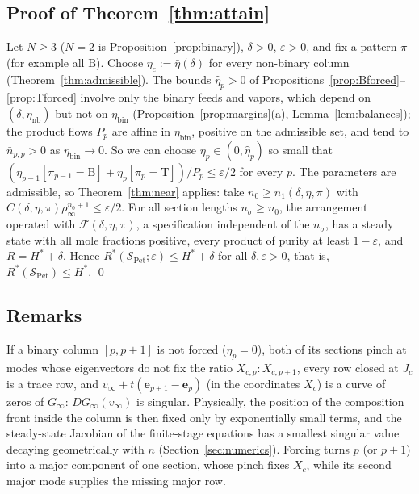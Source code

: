 \documentclass[11pt,a4paper]{report}
\newcommand{\cS}{\mathcal S}
\newcommand{\cF}{\mathcal F}
\newcommand{\bfe}{\mathbf e}
\newcommand{\Hs}{H^{*}}
\newcommand{\Spet}{\cS_{\mathrm{Pet}}}
\newcommand{\Ts}{\mathrm T}
\newcommand{\Bs}{\mathrm B}
\begin{document}
\subsection{Proof of Theorem~\ref{thm:attain}}\label{sec:proofmain}

Let \(N\ge3\) (\(N=2\) is Proposition~\ref{prop:binary}), \(\delta>0\), \(\varepsilon>0\), and fix a pattern \(\pi\) (for example all
\(\Bs\)). Choose \(\eta_c:=\bar\eta(\delta)\) for every non-binary column (Theorem~\ref{thm:admissible}). The bounds \(\hat\eta_p>0\) of
Propositions~\ref{prop:Bforced}--\ref{prop:Tforced} involve only the binary feeds and vapors, which depend on
\((\delta,\eta_{\mathrm{nb}})\) but not on \(\eta_{\mathrm{bin}}\) (Proposition~\ref{prop:margins}(a), Lemma~\ref{lem:balances}); the
product flows \(P_p\) are affine in \(\eta_{\mathrm{bin}}\), positive on the admissible set, and tend to \(\bar n_{p,p}>0\) as
\(\eta_{\mathrm{bin}}\to0\). So we can choose \(\eta_p\in(0,\hat\eta_p)\) so small that
\((\eta_{p-1}[\pi_{p-1}=\Bs]+\eta_p[\pi_p=\Ts])/P_p\le\varepsilon/2\) for every \(p\). The parameters are admissible, so
Theorem~\ref{thm:near} applies: take \(n_0\ge n_1(\delta,\eta,\pi)\) with \(C(\delta,\eta,\pi)\rho_\infty^{n_0+1}\le\varepsilon/2\). For all
section lengths \(n_\sigma\ge n_0\), the arrangement operated with \(\cF(\delta,\eta,\pi)\), a specification independent of the
\(n_\sigma\), has a steady state with all mole fractions positive, every product of purity at least \(1-\varepsilon\), and
\(R=\Hs+\delta\). Hence \(R^*(\Spet;\varepsilon)\le\Hs+\delta\) for all \(\delta,\varepsilon>0\), that is, \(R^*(\Spet)\le\Hs\).
\qed

\subsection{Remarks}\label{sec:remarks}

\begin{remark}\label{rem:forcing}
If a binary column \([p,p+1]\) is not forced (\(\eta_p=0\)), both of its sections pinch at modes whose eigenvectors do not fix the
ratio \(X_{c,p}:X_{c,p+1}\), every row closed at \(J_c\) is a trace row, and \(v_\infty+t(\bfe_{p+1}-\bfe_p)\) (in the coordinates \(X_c\)) is
a curve of zeros of \(G_\infty\): \(DG_\infty(v_\infty)\) is singular. Physically, the position of the composition front inside the
column is then fixed only by exponentially small terms, and the steady-state Jacobian of the finite-stage equations has a
smallest singular value decaying geometrically with \(n\) (Section~\ref{sec:numerics}). Forcing turns \(p\) (or \(p+1\)) into a major
component of one section, whose pinch fixes \(X_c\), while its second major mode supplies the missing major row.
\end{remark}
\end{document}
